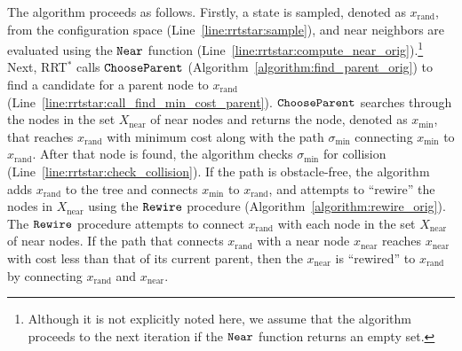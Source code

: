 \documentclass[letterpaper, 10pt, english, conference]{IEEEtran}
\begin{document}
The algorithm proceeds as follows.
Firstly, a state is sampled, denoted as
$x_\mathrm{rand}$, from the configuration space
(Line~\ref{line:rrtstar:sample}), and near neighbors are evaluated
using the ${\tt Near}$ function
(Line~\ref{line:rrtstar:compute_near_orig}).\footnote{Although it is not
  explicitly noted here,
 we assume that the algorithm proceeds to
  the next iteration if the ${\tt Near}$ function returns an empty
  set.} Next, RRT$^*$ calls ${\tt ChooseParent}$
(Algorithm~\ref{algorithm:find_parent_orig}) to find a candidate for a
parent node to $x_\mathrm{rand}$
(Line~\ref{line:rrtstar:call_find_min_cost_parent}). ${\tt
  ChooseParent}$ searches through the nodes in the set
$X_\mathrm{near}$ of near nodes and returns the node, denoted as
$x_\mathrm{min}$, that reaches $x_\mathrm{rand}$ with minimum cost
along with the path $\sigma_\mathrm{min}$ connecting
$x_\mathrm{min}$ to $x_\mathrm{rand}$. After that node
is found, the algorithm checks $\sigma_\mathrm{min}$ for collision
(Line~\ref{line:rrtstar:check_collision}). If the path
is obstacle-free,
the algorithm adds
$x_\mathrm{rand}$ to the tree and connects $x_\mathrm{min}$ to
$x_\mathrm{rand}$, and attempts to ``rewire'' the nodes in
$X_\mathrm{near}$ using the ${\tt Rewire}$ procedure
(Algorithm~\ref{algorithm:rewire_orig}). The ${\tt Rewire}$
procedure attempts to connect $x_\mathrm{rand}$ with each node in the
set $X_\mathrm{near}$ of near nodes. If the path that connects
$x_\mathrm{rand}$ with a near node $x_\mathrm{near}$ reaches
$x_\mathrm{near}$ with cost less than that of its current parent, then
the $x_\mathrm{near}$ is ``rewired'' to $x_\mathrm{rand}$ by
connecting $x_\mathrm{rand}$ and $x_\mathrm{near}$.
\end{document}
